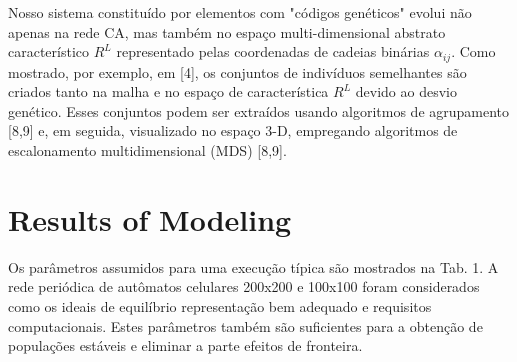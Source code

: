\documentclass{article}
\begin{document}

Nosso sistema constituído por elementos com "códigos genéticos" evolui não apenas na rede CA, mas também no espaço multi-dimensional abstrato característico $R^{L}$ representado pelas coordenadas de cadeias binárias $\alpha_{ij}$. Como mostrado, por exemplo, em [4], os conjuntos de indivíduos semelhantes são criados tanto na malha e no espaço de característica $R^{L}$ devido ao desvio genético. Esses conjuntos podem ser extraídos usando algoritmos de agrupamento [8,9] e, em seguida, visualizado no espaço 3-D, empregando algoritmos de escalonamento multidimensional (MDS) [8,9]. 


\section{Results of Modeling}


Os parâmetros assumidos para uma execução típica são mostrados na Tab. 1. A rede periódica de autômatos celulares 200x200 e 100x100 foram considerados como os ideais de equilíbrio representação bem adequado e requisitos computacionais. Estes parâmetros também são suficientes para a obtenção de populações estáveis e eliminar a parte efeitos de fronteira.

\end{document}
